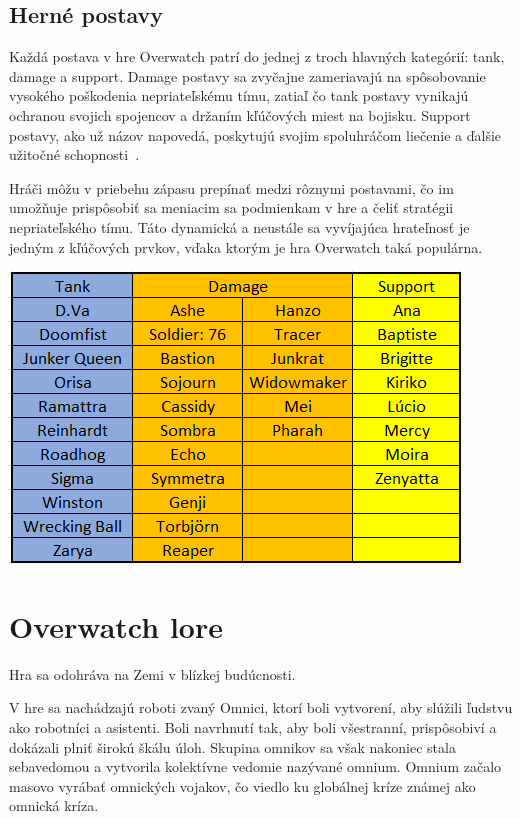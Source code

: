\documentclass[10pt,oneside,slovak,a4paper]{article}
\begin{document}
\subsection{Herné postavy} \label{Herné postavy}

Každá postava v hre Overwatch patrí do jednej z troch hlavných kategórií: tank, damage a support. Damage postavy sa zvyčajne zameriavajú na spôsobovanie vysokého poškodenia nepriateľskému tímu, zatiaľ čo tank postavy vynikajú ochranou svojich spojencov a držaním kľúčových miest na bojisku. Support postavy, ako už názov napovedá, poskytujú svojim spoluhráčom liečenie a ďalšie užitočné schopnosti~\cite{Overwatchranked}.

Hráči môžu v priebehu zápasu prepínať medzi rôznymi postavami, čo im umožňuje prispôsobiť sa meniacim sa podmienkam v hre a čeliť stratégii nepriateľského tímu. Táto dynamická a neustále sa vyvíjajúca hrateľnosť je jedným z kľúčových prvkov, vďaka ktorým je hra Overwatch taká populárna.

\includegraphics[scale=1.25]{images/overwatch_postavy.png}

\section{Overwatch lore} \label{Overwatch lore}

Hra sa odohráva na Zemi v blízkej budúcnosti. 

V hre sa nachádzajú roboti zvaný Omnici, ktorí boli vytvorení, aby slúžili ľudstvu ako robotníci a asistenti. Boli navrhnutí tak, aby boli všestranní, prispôsobiví a dokázali plniť širokú škálu úloh. Skupina omnikov sa však nakoniec stala sebavedomou a vytvorila kolektívne vedomie nazývané omnium. Omnium začalo masovo vyrábať omnických vojakov, čo viedlo ku globálnej kríze známej ako omnická kríza.
\end{document}
